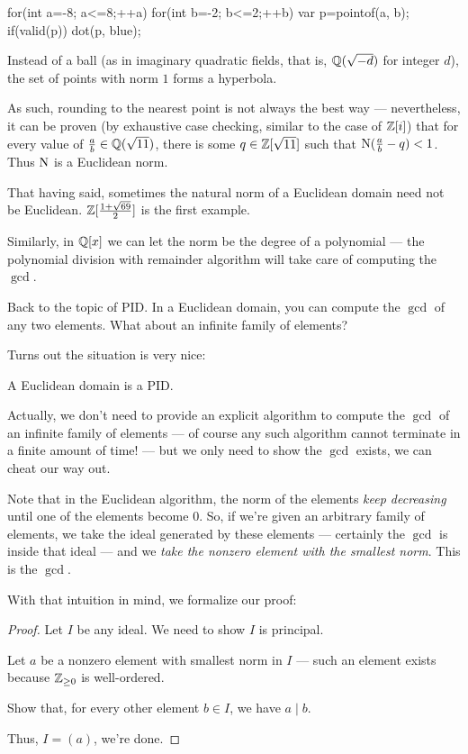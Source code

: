 \begin{example}
\begin{center}
\begin{asy}
		for(int a=-8; a<=8;++a){
			for(int b=-2; b<=2;++b){
				var p=pointof(a, b);
				if(valid(p)) dot(p, blue);
			}
		}
	\end{asy}
	\end{center}

	Instead of a ball (as in imaginary quadratic fields, that is, $\mathbb Q(\sqrt{-d})$ for integer $d$),
	the set of points with norm $1$ forms a hyperbola.

	As such, rounding to the nearest point is not always the best way --- nevertheless, it can be
	proven (by exhaustive case checking, similar to the case of $\mathbb Z[i]$) that for every value of
	$\frac{a}{b} \in \mathbb Q(\sqrt{11})$, there is some $q \in \mathbb Z[\sqrt{11}]$ such that
	$\operatorname{N}(\frac{a}{b}-q) < 1$. Thus $\operatorname{N}$ is a Euclidean norm.
\end{example}

That having said, sometimes the natural norm of a Euclidean domain need not be Euclidean.
$\mathbb Z[\frac{1 + \sqrt{69}}{2}]$ is the first example.

\begin{example}
	Similarly, in $\mathbb Q[x]$ we can let the norm be the degree of a polynomial --- the polynomial
	division with remainder algorithm will take care of computing the $\gcd$.
\end{example}

Back to the topic of PID. In a Euclidean domain, you can compute the $\gcd$ of any two elements.
What about an infinite family of elements?

Turns out the situation is very nice:
\begin{proposition}
	A Euclidean domain is a PID.
\end{proposition}
Actually, we don't need to provide an explicit algorithm to compute the $\gcd$ of an infinite family
of elements --- of course any such algorithm cannot terminate in a finite amount of time! --- but we
only need to show the $\gcd$ exists, we can cheat our way out.

Note that in the Euclidean algorithm, the norm of the elements \emph{keep decreasing} until one of
the elements become $0$. So, if we're given an arbitrary family of elements, we take the ideal
generated by these elements --- certainly the $\gcd$ is inside that ideal --- and we \emph{take the
nonzero element with the smallest norm}. This is the $\gcd$.

With that intuition in mind, we formalize our proof:
\begin{proof}
	Let $I$ be any ideal. We need to show $I$ is principal.

	Let $a$ be a nonzero element with smallest norm in $I$ --- such an element exists because
	$\mathbb Z_{\geq 0}$ is well-ordered.
	\begin{ques}
		Show that, for every other element $b \in I$, we have $a \mid b$.
	\end{ques}
	Thus, $I = (a)$, we're done.
\end{proof}


